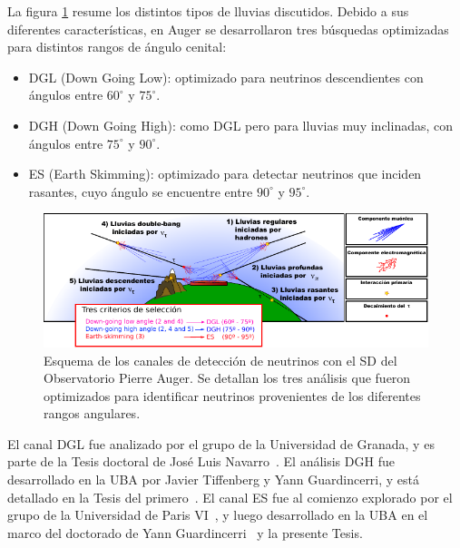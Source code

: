 La figura \ref{fig:augerNu} resume los distintos tipos de lluvias discutidos.
Debido a sus diferentes características, en Auger se desarrollaron tres búsquedas optimizadas para distintos rangos de ángulo cenital:
\begin{itemize}
   \item DGL (Down Going Low): optimizado para neutrinos descendientes con ángulos entre $60^\circ$ y $75^\circ$.
   \item DGH (Down Going High): como DGL pero para lluvias muy inclinadas, con ángulos entre $75^\circ$ y $90^\circ$. 
   \item ES (Earth Skimming): optimizado para detectar neutrinos que inciden rasantes, cuyo ángulo se encuentre entre $90^\circ$ y $95^\circ$.
\end{itemize}
	\begin{figure}[ht!]
		\centering
		\includegraphics[width=\textwidth]{./fig/estrategiaAuger/auger_nu}
		\caption{\label{fig:augerNu}
		Esquema de los canales de detección de neutrinos con el SD del Observatorio Pierre Auger. Se detallan los tres análisis que fueron optimizados para identificar neutrinos provenientes de los diferentes rangos angulares.
		}
	\end{figure}
%

	El canal DGL fue analizado por el grupo de la Universidad de Granada, y es parte de la Tesis doctoral de Jos\'e Luis Navarro~\cite{cite:tesisNavarro}. El análisis DGH fue desarrollado en la UBA por Javier Tiffenberg y Yann Guardincerri, y está detallado en la Tesis del primero~\cite{cite:tesisJavier}. El canal ES fue al comienzo explorado por el grupo de la Universidad de Paris VI~\cite{cite:propagaTierra}, y luego desarrollado en la UBA en el marco del doctorado de Yann Guardincerri~\cite{cite:tesisYann} y la presente Tesis. 

